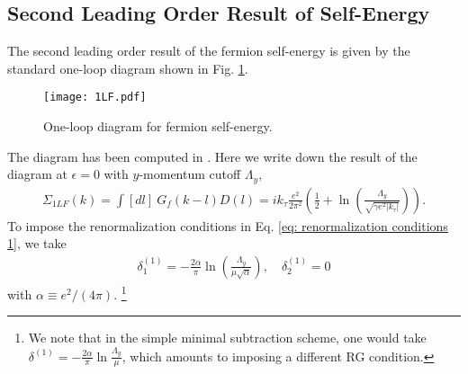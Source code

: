 \documentclass[prx,amsmath,amssymb, notitlepage, onecolumn,
nofootinbib,
superscriptaddress,
longbibliography
]{revtex4-1}
\newcommand{\beq}{\begin{eqnarray}}
\newcommand{\eeq}{\end{eqnarray}}
\begin{document}
\subsection{Second Leading Order Result of Self-Energy}\label{subapp: second leading order result}
The second leading order result of the fermion self-energy is given by the standard one-loop diagram shown in Fig. 
\ref{FD: 1LF}.
\begin{figure}[h]
\begin{center}
\texttt{[image: 1LF.pdf]}
\end{center}
\caption{One-loop diagram for fermion self-energy.} 
\label{FD: 1LF}
\end{figure}
The diagram has been computed in \cite{Mross2010,Zou2020}. Here we write down the result of the diagram at $\epsilon=0$ with $y$-momentum cutoff $\Lambda_y$,
\beq
\Sigma_{1LF}(k) = \int [dl]~G_f(k-l)D(l)=i k_\tau \frac{e^2}{2\pi^2}\left(\frac{1}{2}+\ln\left(\frac{\Lambda_y}{\sqrt{\gamma e^2|k_\tau|}}\right)\right).
\eeq
To impose the renormalization conditions in Eq. \eqref{eq: renormalization conditions 1}, we take
\beq
\delta_1^{(1)} = -\frac{2\alpha}{\pi}\ln\left(\frac{\Lambda_y}{\mu\sqrt{\alpha}}\right),
\quad 
\delta_2^{(1)}=0
\eeq
with $\alpha\equiv e^2/(4\pi)$.
\footnote{
We note that in the simple minimal subtraction scheme, one would take $\delta^{(1)}=-\frac{2\alpha}{\pi}\ln\frac{\Lambda_y}{\mu}$, which amounts  to imposing a different RG condition.
}
\end{document}

